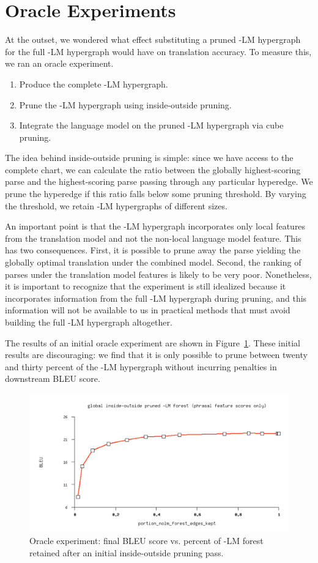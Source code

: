 \section{Oracle Experiments}\label{sec:oracle}

At the outset, we wondered what effect substituting a pruned -LM hypergraph for the full -LM hypergraph would have on translation accuracy.  To measure this, we ran an oracle experiment.  
\begin{enumerate}
	\item Produce the complete -LM hypergraph.
	\item Prune the -LM hypergraph using inside-outside pruning.
	\item Integrate the language model on the pruned -LM hypergraph via cube pruning.
\end{enumerate}
The idea behind inside-outside pruning is simple: since we have access to the complete chart, we can calculate the ratio between the globally highest-scoring parse and the highest-scoring parse passing through any particular hyperedge.  We prune the hyperedge if this ratio falls below some pruning threshold.  By varying the threshold, we retain -LM hypergraphs of different sizes.

An important point is that the -LM hypergraph incorporates only local features from the translation model and not the non-local language model feature.  This has two consequences.  First, it is possible to prune away the parse yielding the globally optimal translation under the combined model.  Second, the ranking of parses under the translation model features is likely to be very poor.  Nonetheless, it is important to recognize that the experiment is still idealized because it incorporates information from the full -LM hypergraph during pruning, and this information will not be available to us in practical methods that must avoid building the full -LM hypergraph altogether.

The results of an initial oracle experiment are shown in Figure~\ref{figure:oracle-untuned}.  These initial results are discouraging: we find that it is only possible to prune between twenty and thirty percent of the -LM hypergraph without incurring penalties in downstream BLEU score.

\begin{figure}
	\includegraphics[scale=0.5]{prune-untuned}
	\caption{Oracle experiment: final BLEU score vs. percent of -LM forest retained after an initial inside-outside pruning pass. \label{figure:oracle-untuned}}
\end{figure}

